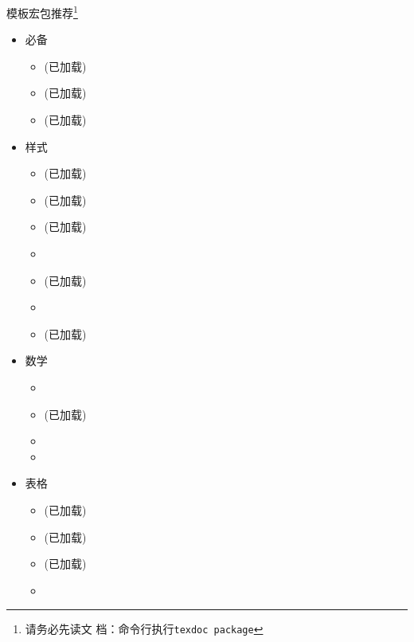 \documentclass[fontset = adobe, xcolor=svgnames, t, aspectratio=169]{ctexbeamer}
\begin{document}
\begin{frame}{\nwafuthesis 模板}{宏包推荐\footnote[frame]{请务必先读文
      档：命令行执行\alert{\texttt{texdoc package}}}}
  \stretchon
  \footnotesize
  \setlength{\leftmarginii}{1.5em}
  \vspace{-18ex}
  \begin{multicols}{3}
    \begin{itemize}
    \item 必备

      \begin{itemize}
      \item {}(已加载)
      \item {}(已加载)
      \item {}(已加载)
      \end{itemize}

    \item 样式

      \begin{itemize}
      \item {}(已加载)
      \item {}(已加载)
      \item {}(已加载)
      \item {}
      \item {}(已加载)
      \item {}
      \item {}(已加载)
      \end{itemize}

    \item 数学

      \begin{itemize}
      \item {}
      \item {}(已加载)
      \item {}
      \item {}
      \end{itemize}

    \item 表格

      \begin{itemize}
      \item {}(已加载)
      \item {}(已加载)
      \item {}(已加载)
      \item {}
      \end{itemize}


\end{itemize}
\end{multicols}
\end{frame}
\end{document}
